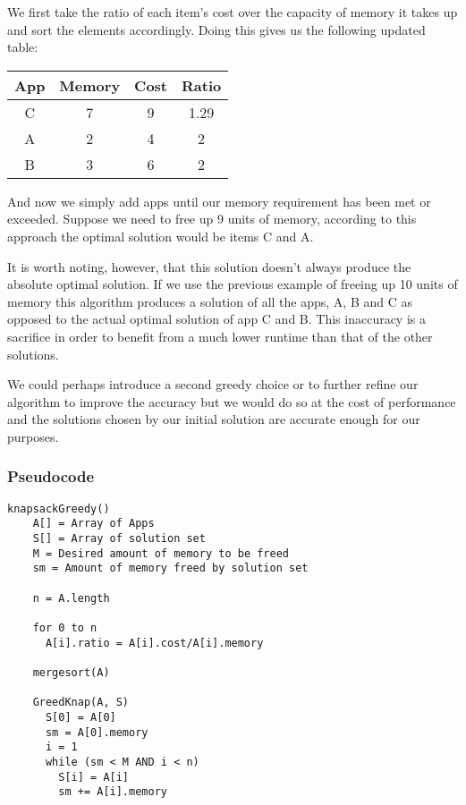\documentclass{article}
\begin{document}
We first take the ratio of each item’s cost over the capacity of memory it takes up and sort the elements accordingly. Doing this gives us the following updated table:

\begin{center}
    \begin{tabular}{|c|c|c|c|}
        \hline
        App & Memory & Cost & Ratio \\ \hline
        C & 7 & 9 & 1.29 \\
        A & 2 & 4 & 2 \\
        B & 3 & 6 & 2 \\
        \hline
    \end{tabular}
\end{center}

And now we simply add apps until our memory requirement has been met or exceeded. Suppose we need to free up 9 units of memory, according to this approach the optimal solution would be items C and A.

It is worth noting, however, that this solution doesn’t always produce the absolute optimal solution. If we use the previous example of freeing up 10 units of memory this algorithm produces a solution of all the apps, A, B and C as opposed to the actual optimal solution of app C and B.  This inaccuracy is a sacrifice in order to benefit from a much lower runtime than that of the other solutions.

We could perhaps introduce a second greedy choice or to further refine our algorithm to improve the accuracy but we would do so at the cost of performance and the solutions chosen by our initial solution are accurate enough for our purposes.

\subsubsection{Pseudocode}
\begin{lstlisting}[mathescape]
knapsackGreedy()
    A[] = Array of Apps
    S[] = Array of solution set
    M = Desired amount of memory to be freed
    sm = Amount of memory freed by solution set

    n = A.length

    for 0 to n
      A[i].ratio = A[i].cost/A[i].memory

    mergesort(A)

    GreedKnap(A, S)
      S[0] = A[0]
      sm = A[0].memory
      i = 1
      while (sm < M AND i < n)
        S[i] = A[i]
        sm += A[i].memory
\end{lstlisting}
\end{document}
